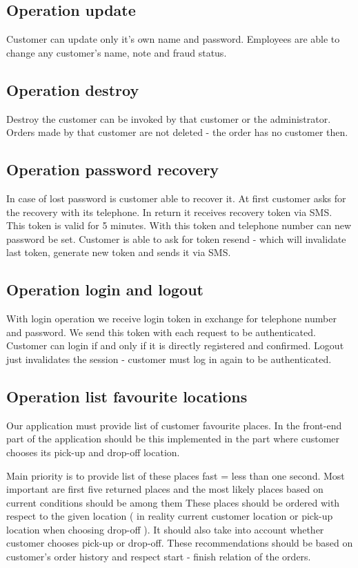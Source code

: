 		
		\subsection{Operation update}
			Customer can update only it's own name and password. Employees are able to change any customer's name, note and fraud status.
		\subsection{Operation destroy}
			Destroy the customer can be invoked by that customer or the administrator. Orders made by that customer are not deleted - the order has no customer then.
		\subsection{Operation password recovery}
			In case of lost password is customer able to recover it. At first customer asks for the recovery with its telephone. In return it receives recovery token via SMS. This token is valid for 5 minutes. With this token and telephone number can new password be set. Customer is able to ask for token resend - which will invalidate last token, generate new token and sends it via SMS.
		\subsection{Operation login and logout}
			With login operation we receive login token in exchange for telephone number and password. We send this token with each request to be authenticated.
			Customer can login if and only if it is directly registered and confirmed.
			Logout just invalidates the session - customer must log in again to be authenticated.
		\subsection{Operation list favourite locations}
			Our application must provide list of customer favourite places. In the front-end part of the application should be this implemented in the part where customer chooses its pick-up and drop-off location. 
			
			Main priority is to provide list of these places fast = less than one second. Most important are first five returned places and the most likely places based on current conditions should be among them These places should be ordered with respect to the given location ( in reality current customer location or pick-up location when choosing drop-off ). It should also take into account whether customer chooses pick-up or drop-off. These recommendations should be based on customer's order history and respect start - finish relation of the orders. 
			
